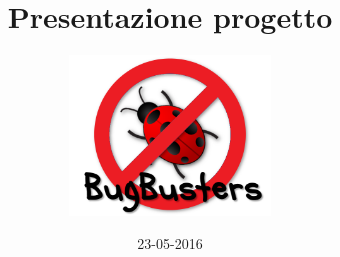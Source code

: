 \documentclass[]{beamer}
\title{Presentazione progetto}
\author[BugBuster]{\includegraphics[width=0.4\textwidth]{logo.png}}
\date{23-05-2016}
\institute{Progetto MaaS}
\begin{document}
\graphicspath{ {res/img/} }



\end{document}
